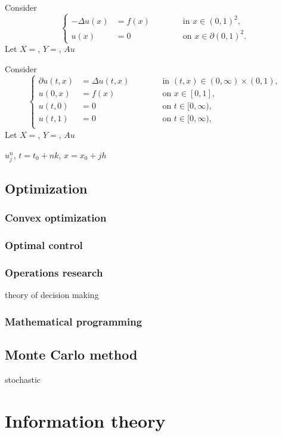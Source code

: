 \documentclass{../../large}
\begin{document}
\begin{ex}
Consider
\[\left\{\begin{alignedat}{2}
-\Delta u(x)&=f(x) &\qquad&\text{ in }x\in(0,1)^2,\\
u(x)&=0 &&\text{ on }x\in\partial(0,1)^2.
\end{alignedat}\right.\]
Let $X=$, $Y=$, $Au$
\end{ex}

\begin{ex}
Consider
\[\left\{\begin{alignedat}{2}
\partial u(t,x)&=\Delta u(t,x) &\qquad&\text{ in }(t,x)\in(0,\infty)\times(0,1),\\
u(0,x)&=f(x) &&\text{ on }x\in[0,1],\\
u(t,0)&=0 &&\text{ on }t\in[0,\infty),\\
u(t,1)&=0 &&\text{ on }t\in[0,\infty),\\
\end{alignedat}\right.\]
Let $X=$, $Y=$, $Au$
\end{ex}


$u_j^n$, $t=t_0+nk$, $x=x_0+jh$




\chapter{Optimization}
\section{Convex optimization}
\section{Optimal control}
\section{Operations research}
theory of decision making
\section{Mathematical programming}


\chapter{Monte Carlo method}
stochastic



\part{Information theory}
\end{document}
